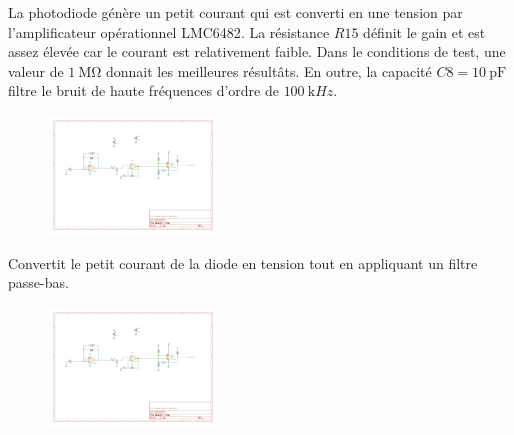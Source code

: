 \documentclass[french]{layout/Report}
\begin{document}
\begin{description}[leftmargin=!,labelwidth=3cm, labelindent=\parindent]
	\item[Convertisseur]
		La photodiode génère un petit courant qui est converti en une tension par l'amplificateur opérationnel LMC6482\cite{LMC6482}.
		La résistance $\mathit{R15}$ définit le gain et est assez élevée car le courant est relativement faible.
		Dans le conditions de test, une valeur de $\SI{1}{\mega\ohm}$ donnait les meilleures résultâts.
		En outre, la capacité $\mathit{C8} = \SI{10}{\pico\farad}$ filtre le bruit de haute fréquences d'ordre de $\SI{100}{\kilo Hz}$.

		\begin{figure}[H]
			\centering
			\includegraphics[width=0.4\textwidth]{fig/current_to_voltage_converter.pdf}
		\end{figure}

	\item[Amplificateur] Convertit le petit courant de la diode en tension tout en appliquant un filtre passe-bas.

		\begin{figure}[H]
			\centering
			\includegraphics[width=0.4\textwidth]{fig/amplifier.pdf}
		\end{figure}


\end{description}
\end{document}
